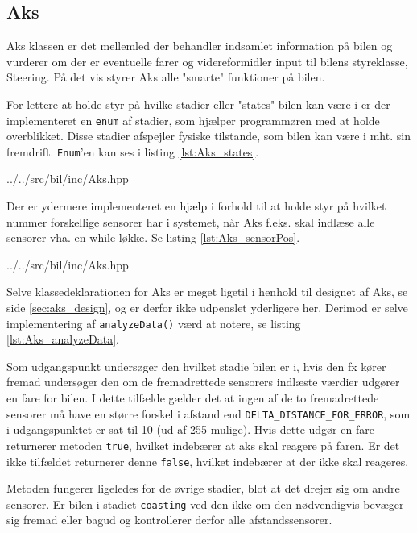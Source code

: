 \subsection{Aks}\label{sec:aks_impl}

Aks klassen er det mellemled der behandler indsamlet information på bilen og vurderer om der er eventuelle farer og videreformidler input til bilens styreklasse, Steering.
På det vis styrer Aks alle "smarte" funktioner på bilen.

For lettere at holde styr på hvilke stadier eller "states" bilen kan være i er der implementeret en \texttt{enum} af stadier, som hjælper programmøren med at holde overblikket. Disse stadier afspejler fysiske tilstande, som bilen kan være i mht. sin fremdrift.
\texttt{Enum}'en kan ses i listing \ref{lst:Aks_states}.


{../../src/bil/inc/Aks.hpp}

Der er ydermere implementeret en hjælp i forhold til at holde styr på hvilket nummer forskellige sensorer har i systemet, når Aks f.eks. skal indlæse alle sensorer vha. en while-løkke. Se listing \ref{lst:Aks_sensorPos}.


{../../src/bil/inc/Aks.hpp}

Selve klassedeklarationen for Aks er meget ligetil i henhold til designet af Aks, se side \ref{sec:aks_design}, og er derfor ikke udpenslet yderligere her.
Derimod er selve implementering af \texttt{analyzeData()} værd at notere, se listing \ref{lst:Aks_analyzeData}.

Som udgangspunkt undersøger den hvilket stadie bilen er i, hvis den fx kører fremad undersøger den om de fremadrettede sensorers indlæste værdier udgører en fare for bilen. 
I dette tilfælde gælder det at ingen af de to fremadrettede sensorer må have en større forskel i afstand end \texttt{DELTA\_DISTANCE\_FOR\_ERROR}, som i udgangspunktet er sat til 10 (ud af 255 mulige).
Hvis dette udgør en fare returnerer metoden \texttt{true}, hvilket indebærer at aks skal reagere på faren.
Er det ikke tilfældet returnerer denne \texttt{false}, hvilket indebærer at der ikke skal reageres.

Metoden fungerer ligeledes for de øvrige stadier, blot at det drejer sig om andre sensorer.
Er bilen i stadiet \texttt{coasting} ved den ikke om den nødvendigvis bevæger sig fremad eller bagud og kontrollerer derfor alle afstandssensorer. 


